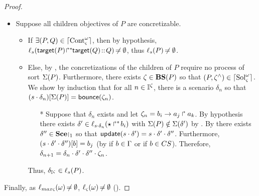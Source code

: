\begin{proof}
\begin{itemize}
  \item Suppose all children objectives of $P$ are concretizable.
  \begin{itemize}
    \item If $\exists (P, Q) \in \lceil \mathrm{Cont}^\omega_\varsigma\rceil$, then by hypothesis,
      $\ell_{s}({\mathsf{target}(P)\!\Rsh^*\!\!\mathsf{target}(Q)} \!::\! Q) \not\nobreak\mkern -2mu = \emptyset$, thus
      $\ell_{s}(P) \not\nobreak\mkern -2mu = \emptyset$.
    \item Else, by , the concretizations of the children of $P$ require no process of sort $\Sigma(P)$.
      Furthermore, there exists $\zeta \in \mathbf{BS}(P)$ so that $(P, \zeta^\wedge) \in \lceil \mathrm{Sol}^\omega_\varsigma\rceil$.
      We show by induction that for all $n \in \mathbb{I}^{\zeta}$, there is a scenario $\delta_n$ so that ${(s \cdot \delta_n)[\Sigma(P)]} = \mathsf{bounce}(\zeta_n)$.
      \begin{itemize}
        \item[*] Suppose that $\delta_n$ exists and let $\zeta_n = b_i\rightarrow a_j\Rsh a_k$.
        By hypothesis there exists $\delta' \in \ell_{s \cdot \delta_n}(\mbox{$\star\Rsh^*\!b_i$})$ with $\Sigma(P) \notin \Sigma(\delta')$ by .
        By  there exists $\delta'' \in \restriction{\Sce}{1}$ so that $\mathsf{update}(s \cdot \delta') = s \cdot \delta' \cdot \delta''$.
        Furthermore, ${(s \cdot \delta' \cdot \delta'')[b]} = b_j$ (by  if $b \in \Gamma$ or  if $b \in CS$).
        Therefore, $\delta_{n+1} = \delta_n \cdot \delta' \cdot \delta'' \cdot \zeta_n$.
      \end{itemize}
      Thus, $\delta_{\mathbb{I}^{\zeta}} \in \ell_s(P)$. %
  \end{itemize}
\end{itemize}
Finally, as $\ell_{max\varsigma}(\omega) \not\nobreak\mkern -2mu = \emptyset$, $\ell_\varsigma(\omega) \not\nobreak\mkern -2mu = \emptyset$ ().
\end{proof}



